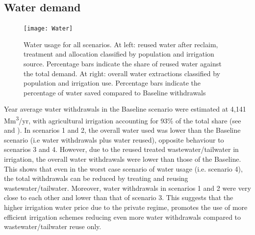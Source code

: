 \subsection{Water demand}
\begin{figure}[!b]
	\centering
	\texttt{[image: Water]}
	\caption{Water usage for all scenarios. At left: reused water after reclaim, treatment and allocation classified by population and irrigation source. Percentage bars indicate the share of reused water against the total demand. At right: overall water extractions classified by population and irrigation use. Percentage bars indicate the percentage of water saved compared to Baseline withdrawals}
	\label{fig:water}
\end{figure}
Year average water withdrawals in the Baseline scenario were estimated at 4,141 Mm\textsuperscript{3}/yr, with agricultural irrigation accounting for 93\% of the total share (see  and ). In scenarios 1 and 2, the overall water used was lower than the Baseline scenario (i.e water withdrawals plus water reused), opposite behaviour to scenarios 3 and 4. However, due to the reused treated wastewater/tailwater in irrigation, the overall water withdrawals were lower than those of the Baseline. This shows that even in the worst case scenario of water usage (i.e. scenario 4), the total withdrawals can be reduced by treating and reusing wastewater/tailwater. Moreover, water withdrawals in scenarios 1 and 2 were very close to each other and lower than that of scenario 3. This suggests that the higher irrigation water price due to the private regime, promotes the use of more efficient irrigation schemes reducing even more water withdrawals compared to wastewater/tailwater reuse only.

